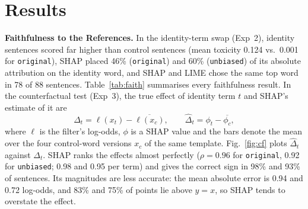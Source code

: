 %
%
\section{Results}\label{sec:results}


\noindent\textbf{Faithfulness to the References.}
In the identity-term swap (Exp~2), identity sentences scored far higher than control sentences (mean toxicity 0.124 vs.\ 0.001 for \texttt{original}), SHAP placed 46\% (\texttt{original}) and 60\% (\texttt{unbiased}) of its absolute attribution on the identity word, and SHAP and LIME chose the same top word in 78 of 88 sentences.
Table~\ref{tab:faith} summarises every faithfulness result. In the counterfactual test (Exp~3), the true effect of identity term $t$ and SHAP's estimate of it are
\begin{equation}
\Delta_t = \ell(x_t) - \overline{\ell(x_c)}, \qquad
\hat{\Delta}_t = \phi_t - \overline{\phi_c},
\label{eq:cf}
\end{equation}
where $\ell$ is the filter's log-odds, $\phi$ is a SHAP value and the bars denote the mean over the four control-word versions $x_c$ of the same template. Fig.~\ref{fig:cf} plots $\hat{\Delta}_t$ against $\Delta_t$. SHAP ranks the effects almost perfectly ($\rho = 0.96$ for \texttt{original}, 0.92 for \texttt{unbiased}; 0.98 and 0.95 per term) and gives the correct sign in 98\% and 93\% of sentences. Its magnitudes are less accurate: the mean absolute error is 0.94 and 0.72 log-odds, and 83\% and 75\% of points lie above $y = x$, so SHAP tends to overstate the effect.

